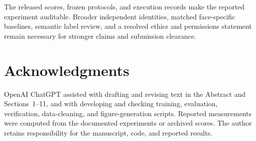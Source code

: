 \documentclass[10pt,journal,compsoc]{IEEEtran}
\begin{document}
The released scores, frozen protocols, and execution records make the reported experiment auditable. Broader independent identities, matched face-specific baselines, semantic label review, and a resolved ethics and permissions statement remain necessary for stronger claims and submission clearance.

\section{Acknowledgments}
\noindent\begin{minipage}{\columnwidth}
OpenAI ChatGPT assisted with drafting and revising text in the Abstract and Sections~1--11, and with developing and checking training, evaluation, verification, data-cleaning, and figure-generation scripts. Reported measurements were computed from the documented experiments or archived scores. The author retains responsibility for the manuscript, code, and reported results.
\end{minipage}
\end{document}
